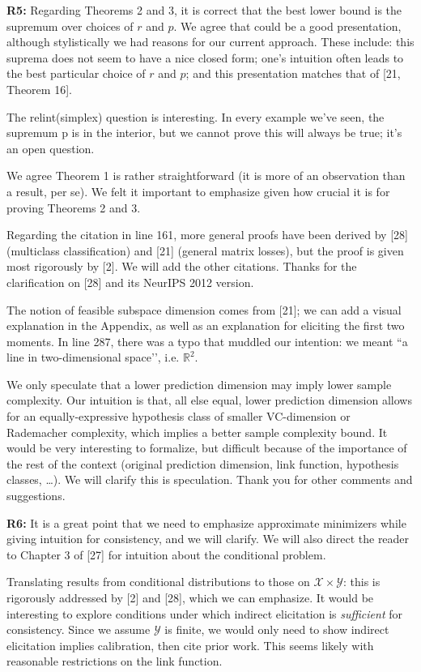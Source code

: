 \documentclass{article}
\newcommand{\reals}{\mathbb{R}}
\newcommand{\X}{\mathcal{X}}
\newcommand{\Y}{\mathcal{Y}}
\begin{document}
\textbf{R5:} Regarding Theorems 2 and 3, it is correct that the best lower bound is the supremum over choices of $r$ and $p$. We agree that could be a good presentation, although stylistically we had reasons for our current approach. These include: this suprema does not seem to have a nice closed form; one’s intuition often leads to the best particular choice of $r$ and $p$; and this presentation matches that of [21, Theorem 16].

The relint(simplex) question is interesting. In every example we’ve seen, the supremum p is in the interior, but we cannot prove this will always be true; it’s an open question.

We agree Theorem 1 is rather straightforward (it is more of an observation than a result, per se).  We felt it important to emphasize given how crucial it is for proving Theorems 2 and 3.

Regarding the citation in line 161, more general proofs have been derived by [28] (multiclass classification) and [21] (general matrix losses), but the proof is given most rigorously by [2].  We will add the other citations. Thanks for the clarification on [28] and its NeurIPS 2012 version.

The notion of feasible subspace dimension comes from [21]; we can add a visual explanation in the Appendix, as well as an explanation for eliciting the first two moments.  In line 287, there was a typo that muddled our intention: we meant ``a line in two-dimensional space’’, i.e. $\reals^2$.

We only speculate that a lower prediction dimension may imply lower sample complexity. Our intuition is that, all else equal, lower prediction dimension allows for an equally-expressive hypothesis class of smaller VC-dimension or Rademacher complexity, which implies a better sample complexity bound. It would be very interesting to formalize, but difficult because of the importance of the rest of the context (original prediction dimension, link function, hypothesis classes, …).  We will clarify this is speculation.
Thank you for other comments and suggestions.

\textbf{R6:}  It is a great point that we need to emphasize approximate minimizers while giving intuition for consistency, and we will clarify.  We will also direct the reader to Chapter 3 of [27] for intuition about the conditional problem.

Translating results from conditional distributions to those on $\X \times \Y$: this is rigorously addressed by [2] and [28], which we can emphasize. It would be interesting to explore conditions under which indirect elicitation is \emph{sufficient} for consistency. Since we assume $\Y$ is finite, we would only need to show indirect elicitation implies calibration, then cite prior work. This seems likely with reasonable restrictions on the link function.
\end{document}

